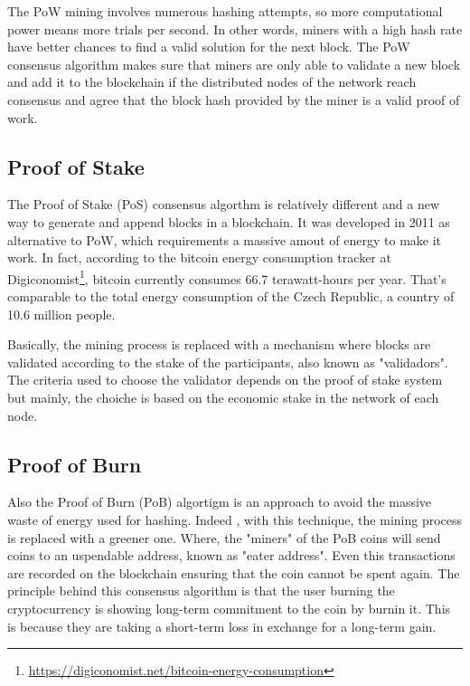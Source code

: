 The PoW mining involves numerous hashing attempts, so more computational 
power means more trials per second. In other words, miners with a high 
hash rate have better chances to find a valid solution for the next 
block. The PoW consensus algorithm makes sure that miners are only able 
to validate a new block and add it to the blockchain if 
the distributed nodes of the network reach consensus and agree that the 
block hash provided by the miner is a valid proof of work.\cite{binancevision}

\subsection{Proof of Stake}
\label{sec:pos}

The Proof of Stake (PoS) consensus algorthm 
is relatively different and a new way to generate and append blocks in a 
blockchain. It was developed in 2011 as alternative to PoW, which requirements
a massive amout of energy to make it work. In fact, according to the 
bitcoin energy consumption tracker at Digiconomist\footnote{\url{https://digiconomist.net/bitcoin-energy-consumption}}, 
bitcoin currently consumes 66.7 terawatt-hours per year. That’s comparable 
to the total energy consumption of the Czech Republic, a country 
of 10.6 million people.

Basically, the mining process is replaced with a mechanism where blocks are
validated according to the stake of the participants, also known as "validadors".
The criteria used to choose the validator depends on the proof of stake system
but mainly, the choiche is based on the economic stake in the network of 
each node.\cite{binancevision}\cite{consensusmedium}

\subsection{Proof of Burn}
\label{sec:pob}

Also the Proof of Burn (PoB) algortigm is an approach to avoid the massive 
waste of energy used for hashing. Indeed , with this technique, the mining
process is replaced with a greener one. Where, the "miners" of the PoB 
coins will send coins to an  uspendable address, known as "eater address".
Even this transactions are recorded on the blockchain ensuring that the coin 
cannot be spent again. The principle behind this consensus algorithm is that
the user burning the cryptocurrency is showing long-term commitment to the
coin by burnin it. This is because they are taking a short-term loss in 
exchange for a long-term gain.\cite{consensusmedium}




